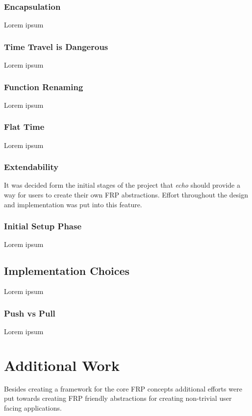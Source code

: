 \documentclass[12pt]{article}
\begin{document}
      \subsubsection{Encapsulation}
      Lorem ipsum
      
      \subsubsection{Time Travel is Dangerous}
      Lorem ipsum
      
      \subsubsection{Function Renaming}
      Lorem ipsum
      
      \subsubsection{Flat Time}
      Lorem ipsum
      
      \subsubsection{Extendability}
      It was decided form the initial stages of the project that \emph{echo} should provide
      a way for users to create their own FRP abstractions. Effort throughout the design and
      implementation was put into this feature.
      
      \subsubsection{Initial Setup Phase}
      Lorem ipsum
      
    \subsection{Implementation Choices}
      Lorem ipsum
      
      \subsubsection{Push vs Pull}
      Lorem ipsum
      
  \section{Additional Work}
    Besides creating a framework for the core FRP concepts additional efforts
    were put towards creating FRP friendly abstractions for creating non-trivial user facing
    applications.
    
\end{document}
